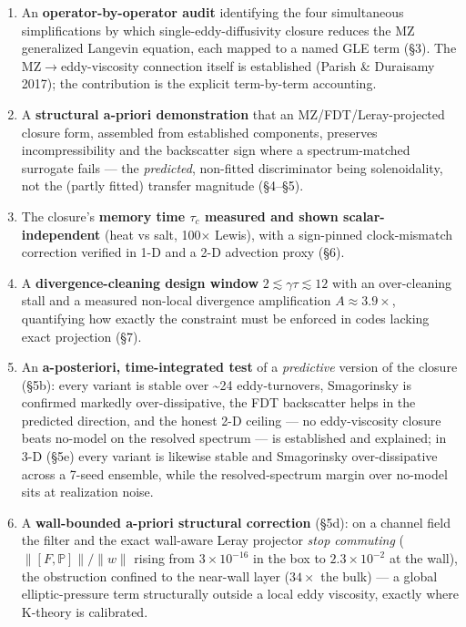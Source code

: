 \documentclass[11pt]{article}
\begin{document}
\begin{enumerate}
\item An \textbf{operator-by-operator audit} identifying the four simultaneous simplifications by which single-eddy-diffusivity closure reduces the MZ generalized Langevin equation, each mapped to a named GLE term (§3). The MZ\ensuremath{\to}eddy-viscosity connection itself is established (Parish \& Duraisamy 2017); the contribution is the explicit term-by-term accounting.
\item A \textbf{structural a-priori demonstration} that an MZ/FDT/Leray-projected closure form, assembled from established components, preserves incompressibility and the backscatter sign where a spectrum-matched surrogate fails — the \emph{predicted}, non-fitted discriminator being solenoidality, not the (partly fitted) transfer magnitude (§4–§5).
\item The closure's \textbf{memory time $\tau _{c}$ measured and shown scalar-independent} (heat vs salt, 100\ensuremath{\times} Lewis), with a sign-pinned clock-mismatch correction verified in 1-D and a 2-D advection proxy (§6).
\item A \textbf{divergence-cleaning design window} $2\lesssim \gamma \tau \lesssim 12$ with an over-cleaning stall and a measured non-local divergence amplification $A\approx 3.9\times $, quantifying how exactly the constraint must be enforced in codes lacking exact projection (§7).
\item An \textbf{a-posteriori, time-integrated test} of a \emph{predictive} version of the closure (§5b): every variant is stable over \textasciitilde{}24 eddy-turnovers, Smagorinsky is confirmed markedly over-dissipative, the FDT backscatter helps in the predicted direction, and the honest 2-D ceiling — no eddy-viscosity closure beats no-model on the resolved spectrum — is established and explained; in 3-D (§5e) every variant is likewise stable and Smagorinsky over-dissipative across a 7-seed ensemble, while the resolved-spectrum margin over no-model sits at realization noise.
\item A \textbf{wall-bounded a-priori structural correction} (\S5d): on a channel field the filter and the exact wall-aware Leray projector \emph{stop commuting} ($\|[F,\mathbb{P}]\|/\|w\|$ rising from $3\times 10^{-16}$ in the box to $2.3\times 10^{-2}$ at the wall), the obstruction confined to the near-wall layer ($34\times$ the bulk) --- a global elliptic-pressure term structurally outside a local eddy viscosity, exactly where K-theory is calibrated.
\end{enumerate}
\end{document}
